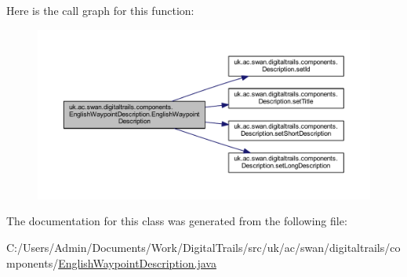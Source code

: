Here is the call graph for this function\+:\nopagebreak
\begin{figure}[H]
\begin{center}
\leavevmode
\includegraphics[width=350pt]{classuk_1_1ac_1_1swan_1_1digitaltrails_1_1components_1_1_english_waypoint_description_aca73e7b961e066f23d130939564d5be5_cgraph}
\end{center}
\end{figure}




The documentation for this class was generated from the following file\+:\begin{DoxyCompactItemize}
\item 
C\+:/\+Users/\+Admin/\+Documents/\+Work/\+Digital\+Trails/src/uk/ac/swan/digitaltrails/components/\hyperlink{_english_waypoint_description_8java}{English\+Waypoint\+Description.\+java}\end{DoxyCompactItemize}
